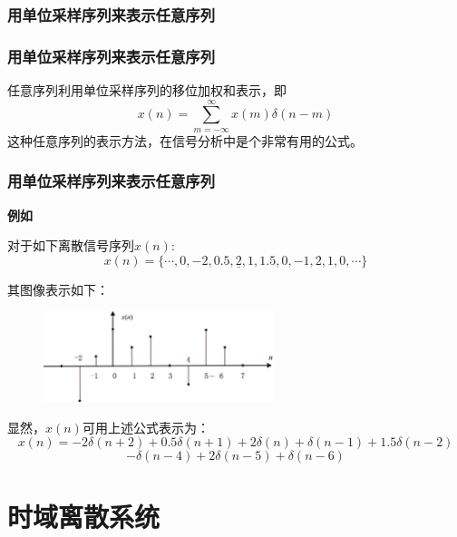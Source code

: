 \documentclass[notheorems,compress,mathserif,table]{beamer}
\begin{document}
\subsubsection*{用单位采样序列来表示任意序列}
\begin{frame}\frametitle{用单位采样序列来表示任意序列}%


任意序列利用单位采样序列的移位加权和表示，即
\begin{equation*}
    x(n) = \sum_{m=-\infty}^{\infty}x(m)\delta(n-m)
\end{equation*}
这种任意序列的表示方法，在信号分析中是个非常有用的公式。
\end{frame}


\begin{frame}\frametitle{用单位采样序列来表示任意序列}%
\textbf{例如}\par
对于如下离散信号序列$x(n)$:
$$x(n) = \{\cdots,0,-2,0.5,\underline{2},1,1.5,0,-1,2,1,0,\cdots\}$$

其图像表示如下：
\begin{figure}[h]
  \centering
  \includegraphics[width=0.6\textwidth]{yiweijiaquanhe.jpg}\\
\end{figure}

显然，$x(n)$可用上述公式表示为：
$$x(n)=-2\delta(n+2)+0.5\delta(n+1)+2\delta(n)+\delta(n-1)+1.5\delta(n-2)$$
$$-\delta(n-4)+2\delta(n-5)+\delta(n-6)$$


\end{frame}

\section{时域离散系统}
\end{document}
